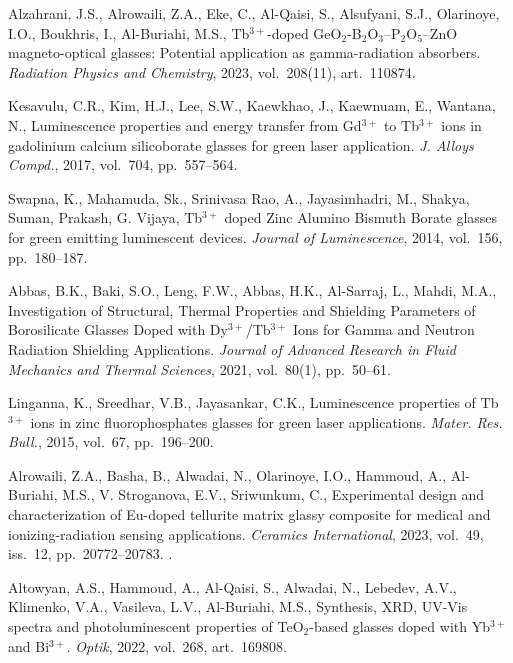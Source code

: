 \documentclass[press]{vestnik}
\begin{document}
\begin{thebibliography}{22}
Alzahrani, J.S., Alrowaili, Z.A., Eke, C., Al-Qaisi, S., Alsufyani, S.J., 
Olarinoye, I.O., Boukhris, I., Al-Buriahi, M.S., Tb$^{3+}$-doped 
GeO$_{2}$-B$_{2}$O$_{3}$--P$_{2}$O$_{5}$--ZnO magneto-optical glasses: 
Potential application as gamma-radiation absorbers. \emph{Radiation Physics and 
Chemistry}, 2023, vol.~208(11), art.~110874.  

Kesavulu, C.R., Kim, H.J., Lee, S.W., Kaewkhao, J., Kaewnuam, E.,  
Wantana, N., Luminescence properties and energy transfer from Gd$^{3+}$ to 
Tb$^{3+}$ ions in gadolinium calcium silicoborate glasses for green laser 
application. \emph{J. Alloys Compd.}, 2017, vol.~704, pp.~557--564. 

Swapna, K., Mahamuda, Sk., Srinivasa Rao, A., Jayasimhadri, M., Shakya, 
Suman, Prakash, G. Vijaya, Tb$^{3+}$ doped Zinc Alumino Bismuth Borate 
glasses for green emitting luminescent devices. \emph{Journal of Luminescence}, 
2014, vol.~156, pp.~180--187. 

Abbas, B.K., Baki, S.O., Leng, F.W., Abbas, H.K., Al-Sarraj, L., Mahdi, M.A., Investigation of Structural, Thermal Properties and Shielding 
Parameters of Borosilicate Glasses Doped with Dy$^{3+}$/Tb$^{3+}$ Ions for 
Gamma and Neutron Radiation Shielding Applications. \emph{Journal of Advanced 
Research in Fluid Mechanics and Thermal Sciences}, 2021, vol.~80(1), pp.~50--61. 

Linganna, K., Sreedhar, V.B., Jayasankar, C.K., Luminescence properties of Tb$^{3+}$ ions in zinc fluorophosphates glasses for green laser applications. \emph{Mater. Res. Bull.}, 2015, vol.~67, pp.~196--200. 

Alrowaili, Z.A., Basha, B., Alwadai, N., Olarinoye, I.O., Hammoud, A., 
Al-Buriahi, M.S., V. Stroganova, E.V., Sriwunkum, C., Experimental design and 
characterization of Eu-doped tellurite matrix glassy composite for medical 
and ionizing-radiation sensing applications. \emph{Ceramics International}, 2023, 
vol.~49, iss.~12, pp.~20772--20783. .

Altowyan, A.S., Hammoud, A., Al-Qaisi, S., Alwadai, N., Lebedev, A.V., 
Klimenko, V.A., Vasileva, L.V., Al-Buriahi, M.S., Synthesis, XRD, UV-Vis 
spectra and photoluminescent properties of TeO$_{2}$-based glasses doped 
with Yb$^{3+}$ and Bi$^{3+}$. \emph{Optik}, 2022, vol.~268, art.~169808. 


\end{thebibliography}
\end{document}
